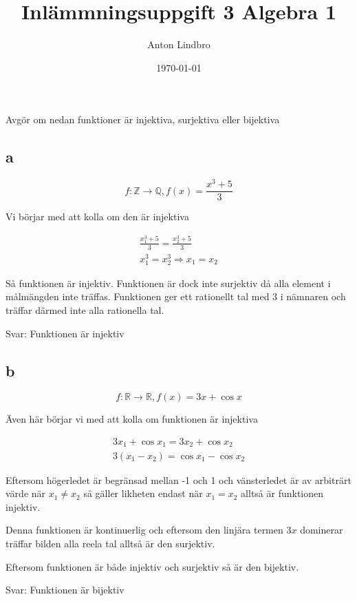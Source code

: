 \documentclass[a4paper]{article}
\title{Inlämmningsuppgift 3 Algebra 1}
\author{Anton Lindbro}
\date{\today}
\begin{document}
\maketitle

\section{}
Avgör om nedan funktioner är injektiva, surjektiva eller bijektiva

\subsection*{a}
\begin{equation}
    f: \mathbb{Z} \rightarrow \mathbb{Q}, f(x) = \frac{x^3 + 5}{3}
\end{equation}

Vi börjar med att kolla om den är injektiva

\begin{align}
    \frac{x_1^3 + 5}{3} = \frac{x_2^3 + 5}{3}\\
    x_1^3 = x_2^3 \Rightarrow x_1 = x_2 
\end{align}

Så funktionen är injektiv. Funktionen är dock inte surjektiv då alla element i målmängden inte träffas. Funktionen ger ett rationellt tal med 3 i nämnaren och träffar därmed inte alla rationella tal. 

Svar: Funktionen är injektiv

\subsection*{b}
\begin{equation}
    f: \mathbb{R} \rightarrow \mathbb{R}, f(x) = 3x+ \cos{x}
\end{equation}

Även här börjar vi med att kolla om funktionen är injektiva

\begin{align}
    3x_1 + \cos{x_1} = 3x_2 + \cos{x_2} \\
    3(x_1 - x_2) = \cos{x_1} - \cos{x_2}
\end{align}

Eftersom högerledet är begränsad mellan -1 och 1 och vänsterledet är av arbiträrt värde när $x_1 \neq x_2$ så gäller likheten endast när $x_1 = x_2$ alltså är funktionen injektiv. 

Denna funktionen är kontinuerlig och eftersom den linjära termen $3x$ dominerar träffar bilden alla reela tal alltså är den surjektiv.

Eftersom funktionen är både injektiv och surjektiv så är den bijektiv. 

Svar: Funktionen är bijektiv
\end{document}
